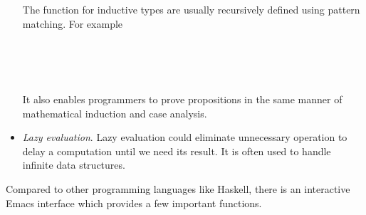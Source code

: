 \begin{itemize}
The function for inductive types are usually recursively defined using pattern matching. For example
\begin{code}\>\<%
\\
\> \AgdaSymbol{:}   \<%
\\
\>  \AgdaSymbol{=} \<%
\\
\> \AgdaSymbol{(} \AgdaSymbol{)} \AgdaSymbol{=}  \AgdaSymbol{(} \AgdaSymbol{(} \AgdaSymbol{))}\<%
\>\<\end{code}

It also enables programmers to prove propositions in the same manner of mathematical induction and case analysis.

\item \textit{Lazy evaluation}. Lazy evaluation could eliminate unnecessary operation to delay a computation until we need its result. It is often used to handle infinite data structures. \cite{wiki:Lazy_evaluation}

\end{itemize}

Compared to other programming languages like Haskell, there is an interactive Emacs interface which provides a few important functions.

